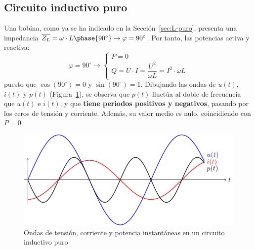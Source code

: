 	\subsection{Circuito inductivo puro}\label{sec.potencia_L}
	Una bobina, como ya se ha indicado en la
        Sección~\ref{sec:L-puro}, presenta una impedancia
        $\overline{Z_L}=\omega\cdot L\phase{90^\circ}\rightarrow
        \varphi=90^\circ$. Por tanto, las potencias activa y reactiva:
	\begin{equation}
          \varphi = 90^\circ \rightarrow
          \boxed{\begin{cases}
            P = 0\\
            Q = U\cdot I = \dfrac{U^2}{\omega L} = I^2\cdot  \omega L
          \end{cases}}
      \end{equation}
      puesto que $\cos(90^\circ)=0$ y $\sin(90^\circ)=1$. Dibujando
      las ondas de $u(t)$, $i(t)$ y $p(t)$
      (Figura~\ref{fig.inductivoPotencia}), se observa que $p(t)$
      fluctúa al doble de frecuencia que $u(t)$ e $i(t)$, y que
      \textbf{tiene periodos positivos y negativos}, pasando por los
      ceros de tensión y corriente. Además, su valor medio es nulo,
      coincidiendo con $P=0$.
      \begin{figure}[H]
        \centering \includegraphics{../figs/inductivoPuroPotencia.pdf}
        \caption{Ondas de tensión, corriente y potencia instantáneas
          en un circuito inductivo puro}
        \label{fig.inductivoPotencia}
      \end{figure}
	
